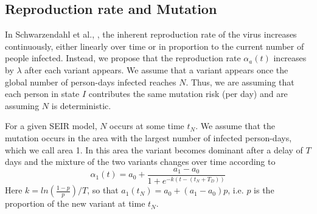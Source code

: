 \documentclass{article}
\begin{document}

\subsection{Reproduction rate and Mutation}
In Schwarzendahl et al., \cite{m2}, the inherent reproduction rate of the virus increases continuously, either linearly over time or in proportion to the current number of people infected. Instead, we propose that the reproduction rate $\alpha_a(t)$ increases by $\lambda$ after each variant appears. We assume that a variant appears once the global number of person-days infected reaches $N$. Thus, we are assuming that each person in state $I$ contributes the same mutation risk (per day) and are assuming $N$ is deterministic. 

For a given SEIR model, $N$ occurs at some time $t_N$. We assume that the mutation occurs in the area with the largest number of infected person-days, which we call area 1. In this area the variant becomes dominant after a delay of $T$ days and the mixture of the two variants changes over time according to
\begin{equation}\label{eq:infection_rate}
        \alpha_{1}(t) = a_0 + \frac{a_1 - a_0}{1+e^{-k(t-(t_N + T_D))}}
    \end{equation}
Here $k=ln\left(\frac{1-p}{p}\right)/T$, so that $a_1(t_N) = a_0 + (a_1-a_0)p$, i.e. $p$ is the proportion of the new variant at time $t_N$.
    
\end{document}
